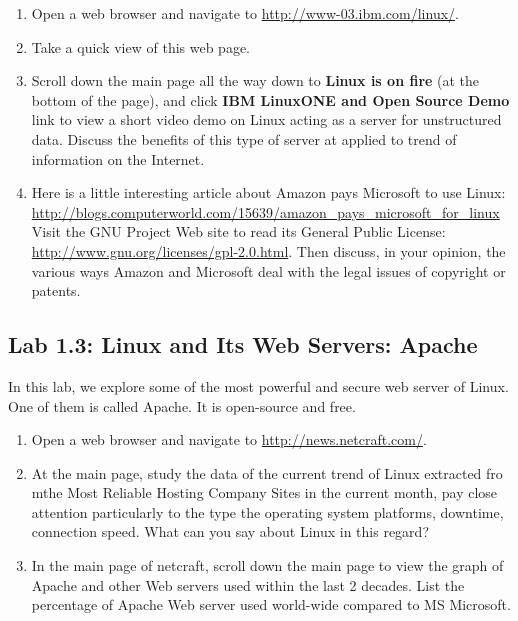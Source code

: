 \begin{enumerate}
\item Open a web browser and navigate to {\url{http://www-03.ibm.com/linux/}}. 
\item Take a quick view of this web page.
\item Scroll down the main page all the way down to {\bf{Linux is on fire}} (at the bottom of the page), and click {\bf{IBM LinuxONE and Open Source Demo}} link to view a short video demo on Linux acting as a server for unstructured data. Discuss the benefits of this type of server at applied to trend of information on the Internet.  

\vspace{0.75in}

\item Here is a little interesting article about Amazon pays Microsoft to use Linux: \\
{\url{http://blogs.computerworld.com/15639/amazon_pays_microsoft_for_linux}} \\

\noindent Visit the GNU Project Web site to read its General Public License: {\url{http://www.gnu.org/licenses/gpl-2.0.html}}. Then discuss, in your opinion, the various ways Amazon and Microsoft deal with the legal issues of copyright or patents. 

\vspace{1in}

\end{enumerate}

\subsection*{Lab 1.3: Linux and Its Web Servers: Apache}
In this lab, we explore some of the most powerful and secure web server of Linux. One of them is called Apache. It is open-source and free. 

\begin{enumerate}
\item Open a web browser and navigate to {\url{http://news.netcraft.com/}}. 
\item At the main page, study the data of the current trend of Linux extracted fro mthe Most Reliable Hosting Company Sites in the current month, pay close attention particularly to the type the operating system platforms, downtime, connection speed. What can you say about Linux in this regard?

\vspace{0.75in}

\item In the main page of netcraft, scroll down the main page to view the graph of Apache and other Web servers used within the last 2 decades. List the percentage of Apache Web server used world-wide compared to MS Microsoft. 

\vspace{0.5in}

\end{enumerate}

